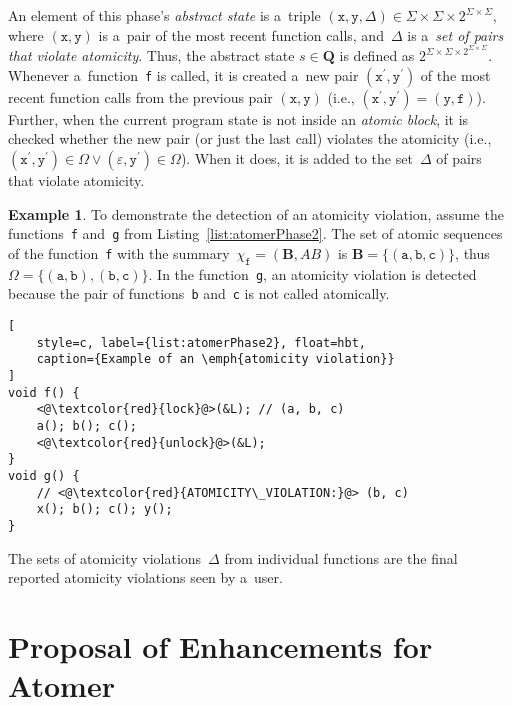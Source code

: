 \documentclass{ExcelAtFIT}
\theoremstyle{definition}
\newtheorem{example}{Example}[section]
\begin{document}
An element of this phase's \emph{abstract state} is a~triple $ {(\mathtt{x}, \mathtt{y}, \Delta)} \in \Sigma \times \Sigma \times 2^{\Sigma \times \Sigma} $, where $ {(\mathtt{x}, \mathtt{y})} $ is a~pair of the most recent function calls, and~$ \Delta $ is a~\emph{set of pairs that violate atomicity}. Thus, the abstract state $ s \in \boldsymbol{Q} $ is defined as $ 2^{\Sigma \times \Sigma \times 2^{\Sigma \times \Sigma}} $. Whenever a~function~\texttt{f} is called, it is created a~new pair ${ (\mathtt{x}^\prime, \mathtt{y}^\prime) }$ of the most recent function calls from the previous pair ${ (\mathtt{x}, \mathtt{y}) }$ (i.e., $ {(\mathtt{x}^\prime, \mathtt{y}^\prime)} = {(\mathtt{y}, \mathtt{f})} $). Further, when the current program state is not inside an \emph{atomic block}, it is checked whether the new pair (or just the last call) violates the atomicity (i.e., $ {(\mathtt{x}^\prime, \mathtt{y}^\prime)} \in \Omega \vee {(\varepsilon, \mathtt{y}^\prime)} \in \Omega $). When it does, it is added to the set~$ \Delta $ of pairs that violate atomicity.

\begin{example}
    \sloppy
    To demonstrate the detection of an atomicity violation, assume the functions~\texttt{f} and~\texttt{g} from Listing~\ref{list:atomerPhase2}. The set of atomic sequences of the function~\texttt{f} with the summary~$ \chi_\mathtt{f} = (\boldsymbol{B}, AB) $ is $ \boldsymbol{B} = \{(\mathtt{a, b, c})\} $, thus $ \Omega = \{{(\mathtt{a, b})}, {(\mathtt{b, c})}\} $. In the function~\texttt{g}, an atomicity violation is detected because the pair of functions~\texttt{b} and~\texttt{c} is not called atomically.
\end{example}

\begin{lstlisting}[
    style=c, label={list:atomerPhase2}, float=hbt,
    caption={Example of an \emph{atomicity violation}}
]
void f() {
    <@\textcolor{red}{lock}@>(&L); // (a, b, c)
    a(); b(); c();
    <@\textcolor{red}{unlock}@>(&L);
}
void g() {
    // <@\textcolor{red}{ATOMICITY\_VIOLATION:}@> (b, c)
    x(); b(); c(); y();
}
\end{lstlisting}

The sets of atomicity violations~$ \Delta $ from individual functions are the final reported atomicity violations seen by a~user.


\section{\hspace{-.15em}Proposal of Enhancements for Atomer}
\label{sec:proposal}
\end{document}
